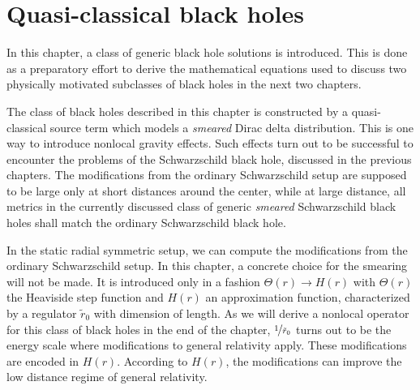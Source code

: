 \documentclass[12pt,a4paper]{report}
\numberwithin{equation}{chapter}
\begin{document}
\chapter{Quasi-classical black holes}\label{sec:generic-H}
In this chapter, a class of generic black hole solutions is introduced. This is done as a preparatory effort to derive the mathematical equations used to discuss two physically motivated subclasses of black holes in the next two chapters.

The class of black holes described in this chapter is constructed by a quasi-classical source term which models a \emph{smeared} Dirac delta distribution. This is one way to introduce nonlocal gravity effects. Such effects turn out to be successful to encounter the problems of the Schwarzschild black hole, discussed in the previous chapters. The modifications from the ordinary Schwarzschild setup are supposed to be large only at short distances around the center, while at large distance, all metrics in the currently discussed class of generic \emph{smeared} Schwarzschild black holes shall match the ordinary Schwarzschild black hole.

In the static radial symmetric setup, we can compute the modifications from the ordinary Schwarzschild setup. In this chapter, a concrete choice for the smearing will not be made. It is introduced only in a fashion $\Theta(r) \to H(r)$ with $\Theta(r)$ the Heaviside step function and $H(r)$ an approximation function, characterized by a regulator $\tilde r_0$ with dimension of length. As we will derive a nonlocal operator for this class of black holes in the end of the chapter, $\nicefrac 1{\tilde r_0}$ turns out to be the energy scale where modifications to general relativity apply. These modifications are encoded in $H(r)$. According to $H(r)$, the modifications can improve the low distance regime of general relativity.
\end{document}
